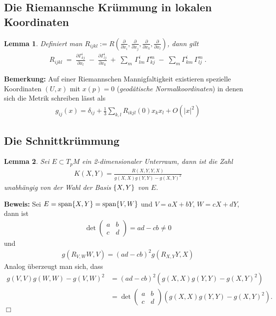 \documentclass[12pt,a4paper]{article}
\newtheorem{Lemma}{Lemma}[section]
\def\proof{\noindent\textbf{Beweis:}\quad}
\def\qed{\quad\hfill\ensuremath{\Box}}
\begin{document}
\subsection{Die Riemannsche Kr\"ummung in lokalen Koordinaten}

\begin{Lemma}
Definiert man $R_{ijkl} := R(\frac{\partial}{\partial
x_i},\frac{\partial}{\partial x_j},\frac{\partial}{\partial
x_k},\frac{\partial}{\partial x_l})$, dann gilt
\begin{align*}
R_{ijkl} \;= \;
\tfrac{\partial \Gamma^i_{k j}}{\partial x_l}
\;-\;
\tfrac{\partial \Gamma^i_{lj}}{\partial x_k}
\;+\;
\sum_m \, \Gamma^i_{lm} \, \Gamma^m_{k j}
\;-\;
\sum_m \Gamma^i_{km} \, \Gamma^m_{l j} \ . 
\end{align*}
\end{Lemma}

\bigskip

{\bf Bemerkung:}
Auf einer Riemannschen Mannigfaltigkeit existieren spezielle Koordinaten $(U,x)$
mit $x(p) = 0$ (\emph{geod\"atische Normalkoordinaten}) in denen sich die Metrik
schreiben l\"asst als
\begin{align*}
g_{ij}(x) = \delta_{ij} + \frac{1}{3}\sum_{k,l} R_{ikjl}(0)x_kx_l + O(|x|^2)
\end{align*} 


\subsection{Die Schnittkr\"ummung}

\begin{Lemma}
Sei $E\subset T_pM$ ein 2-dimensionaler Unterraum, dann ist die Zahl
\begin{align*}
K(X,Y) = \frac{R(X,Y,Y,X)}{g(X,X)g(Y,Y)-g(X,Y)^2}
\end{align*}
unabh\"angig von der Wahl der Basis $\{X,Y\}$ von $E$.
\end{Lemma}

\proof
Sei $E=\mathrm {span}\{X,Y\} = \mathrm {span}\{V,W\}$ und $V=aX+bY$, $W=
cX+dY$, dann ist
\begin{align*}
\det\begin{pmatrix}
a & b\\
c & d
\end{pmatrix}
= ad-cb \neq 0
\end{align*}
und
\begin{align*}
g(R_{V,W}W,V) = (ad-cb)^2g(R_{X,Y}Y,X) 
\end{align*}
Analog \"uberzeugt man sich, dass
\begin{align*}
g(V,V)g(W,W) - g(V,W)^2  
&= (ad-cb)^2\left(g(X,X)g(Y,Y) -
g(X,Y)^2 \right) \\ &=
\det\left(\begin{smallmatrix}
a & b\\
c & d
\end{smallmatrix}\right)
\left(g(X,X)g(Y,Y) -
g(X,Y)^2 \right).
\end{align*}
\qed
\end{document}
